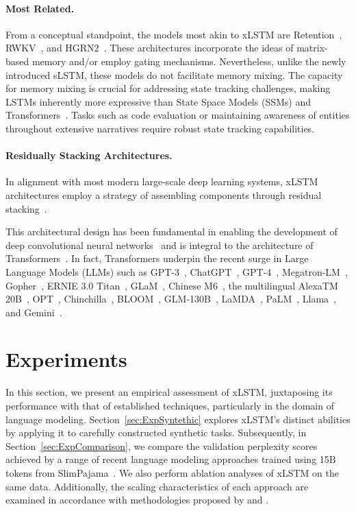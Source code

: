 \paragraph{Most Related.} From a conceptual standpoint, the models most akin to xLSTM are Retention~\citep{Sun:23arxiv}, RWKV~\citep{Peng:23arxivshort,Peng:24arxivshort}, and HGRN2~\citep{Qin:24arxiv}. These architectures incorporate the ideas of matrix-based memory and/or employ gating mechanisms. Nevertheless, unlike the newly introduced sLSTM, these models do not facilitate memory mixing. The capacity for memory mixing is crucial for addressing state tracking challenges, making LSTMs inherently more expressive than State Space Models (SSMs) and Transformers~\citep{Merrill:24,Deletang:23}. Tasks such as code evaluation or maintaining awareness of entities throughout extensive narratives require robust state tracking capabilities.

\paragraph{Residually Stacking Architectures.} In alignment with most modern large-scale deep learning systems, xLSTM architectures employ a strategy of assembling components through residual stacking~\citep{Srivastava:15,He:16}.

This architectural design has been fundamental in enabling the development of deep convolutional neural networks~\citep{He:16} and is integral to the architecture of Transformers~\citep{Vaswani:17}. In fact, Transformers underpin the recent surge in Large Language Models (LLMs) such as GPT-3~\citep{Brown:20short}, ChatGPT~\citep{Schulman:22short}, GPT-4~\citep{Achiam:23gpt4short}, Megatron-LM~\citep{Shoeybi:19}, Gopher~\citep{Rae:21short}, ERNIE 3.0 Titan~\citep{Wang:21arxivshort}, GLaM~\citep{Du:21glamshort}, Chinese M6~\citep{Lin:21}, the multilingual AlexaTM 20B~\citep{Soltan:22}, OPT~\citep{Zhang:22opt}, Chinchilla~\citep{Hoffmann:22short}, BLOOM~\citep{Scao:22arxivshort}, GLM-130B~\citep{Zeng:22arxivshort}, LaMDA~\citep{Thoppilan:22short}, PaLM~\citep{Chowdhery:22short}, Llama~\citep{Touvron:23arxiv}, and Gemini~\citep{GeminiTeam:23arxiv,Reid:24arxiv}.

\section{Experiments}
\label{sec:Exp}

In this section, we present an empirical assessment of xLSTM, juxtaposing its performance with that of established techniques, particularly in the domain of language modeling. Section~\ref{sec:ExpSyntethic} explores xLSTM’s distinct abilities by applying it to carefully constructed synthetic tasks. Subsequently, in Section~\ref{sec:ExpComparison}, we compare the validation perplexity scores achieved by a range of recent language modeling approaches trained using 15B tokens from SlimPajama~\citep{Soboleva:23}. We also perform ablation analyses of xLSTM on the same data. Additionally, the scaling characteristics of each approach are examined in accordance with methodologies proposed by \citet{Kaplan:20} and \citet{Brown:20short}.

